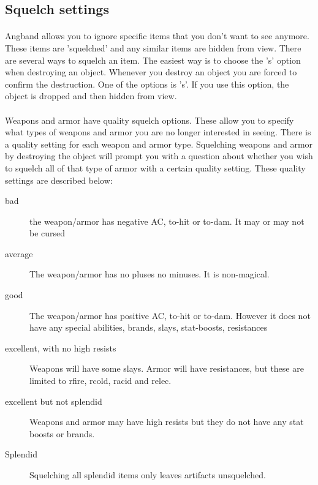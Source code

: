 \subsection{Squelch settings}
\paragraph{}Angband allows you to ignore specific items that you don't want
to see anymore. These items are 'squelched' and any similar items are
hidden from view. There are several ways to squelch an item. The easiest
way is to choose the 's' option when destroying an object. Whenever you
destroy an object you are forced to confirm the destruction. One of the
options is 's'. If you use this option, the object is dropped and then
hidden from view.

\paragraph{}Weapons and armor have quality squelch options. These allow you
to specify what types of weapons and armor you are no longer interested
in seeing. There is a quality setting for each weapon and armor type.
Squelching weapons and armor by destroying the object will prompt you with
a question about whether you wish to squelch all of that type of armor with
a certain quality setting. These quality settings are described below:
\begin{description} 
\item[bad] the weapon/armor has negative AC, to-hit
    or to-dam. It may or may not be cursed

\item[average] The weapon/armor has no pluses no minuses. It is
    non-magical.

\item[good] The weapon/armor has positive AC, to-hit or to-dam. However
    it does not have any special abilities, brands, slays, stat-boosts,
    resistances
 
\item[excellent, with no high resists] Weapons will have some slays.
    Armor will have resistances, but these are limited to rfire, rcold,
    racid and relec.

\item[excellent but not splendid] Weapons and armor may have high
    resists but they do not have any stat boosts or brands.

\item[Splendid] Squelching all splendid items only leaves artifacts
    unsquelched.  
\end{description}


